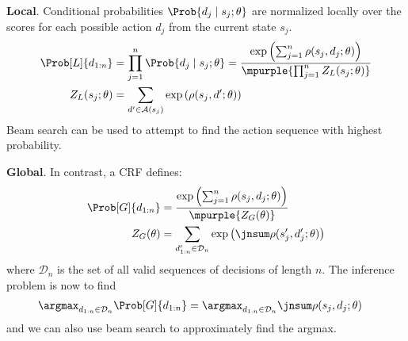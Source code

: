 \documentclass[11pt]{article}
\begin{document}
\begin{compactitem}
	\item \textbf{Local}. Conditional probabilities $\Prob{d_j \mid s_j; \theta }$ are normalized locally over the scores for each possible action $d_j$ from the current state $s_j$. 
	\begin{align}
	\Prob[L]{d_{1:n}} 
	&= \prod_{j = 1}^{n} \Prob{d_j \mid s_j; \theta } 
	= \dfrac{   \exp \left( \sum_{j = 1}^{n} \rho  ( s_j, d_j ; \theta  ) \right)
	}{ \mpurple{ \prod_{j = 1}^{n} Z_L (s_j; \theta) }  } \\
	Z_L(s_j; \theta)
	&= \sum_{ d' \in \mathcal{A}(s_j) } \exp \left( \rho ( s_j, d'; \theta )  \right)
	\end{align}
	Beam search can be used to attempt to find the action sequence with highest probability. 
	
	\item \textbf{Global}. In contrast, a CRF defines:
	\begin{align}
	\Prob[G]{d_{1:n}}
	&= \dfrac{   \exp \left( \sum_{j = 1}^{n} \rho  ( s_j, d_j ; \theta  ) \right)
	}{ \mpurple{Z_G (\theta)}  } \\
	Z_G(\theta) 
	&=
	\sum_{d_{1:n}' \in \mathcal{D}_n } \exp \left( 
	\jnsum \rho ( s_j', d_j'; \theta )
	\right)
	\end{align}
	where $\mathcal{D}_n$ is the set of all valid sequences of decisions of length $n$. The inference problem is now to find
	\begin{align}
	\argmax_{d_{1:n} \in \mathcal{D}_n} \Prob[G]{d_{1:n}}
	&= \argmax_{d_{1:n} \in \mathcal{D}_n} \jnsum \rho(s_j, d_j; \theta) 
	\end{align}
	and we can also use beam search to approximately find the argmax. 
\end{compactitem}
\end{document}
